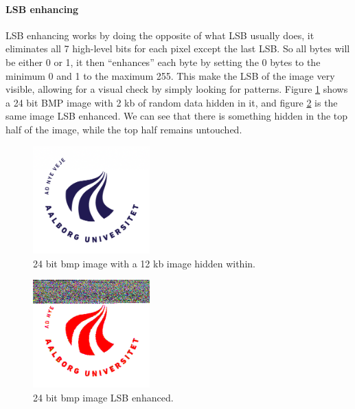 
\paragraph*{LSB enhancing}
LSB enhancing works by doing the opposite of what LSB usually does, it eliminates all 7 high-level bits for each pixel except the last LSB. 
So all bytes will be either 0 or 1, it then ``enhances'' each byte by setting the 0 bytes to the minimum 0 and 1 to the maximum 255.
This make the LSB of the image very visible, allowing for a visual check by simply looking for patterns.
Figure \ref{fig:hiddenAAU} shows a 24 bit BMP image with 2 kb of random data hidden in it, and figure \ref{fig:LSBenhanced} is the same image LSB enhanced.
We can see that there is something hidden in the top half of the image, while the top half remains untouched\citep{Westfeld2000}.

\begin{figure}
	\centering
	\includegraphics[width=0.4\textwidth]{figures/StegoAAU.png}
	\caption{24 bit bmp image with a 12 kb image hidden within.}
	\label{fig:hiddenAAU}
\end{figure}

\begin{figure}
	\centering
	\includegraphics[width=0.4\textwidth]{figures/StegoAAULSB.png}
	\caption{24 bit bmp image LSB enhanced.}
	\label{fig:LSBenhanced}
\end{figure}

